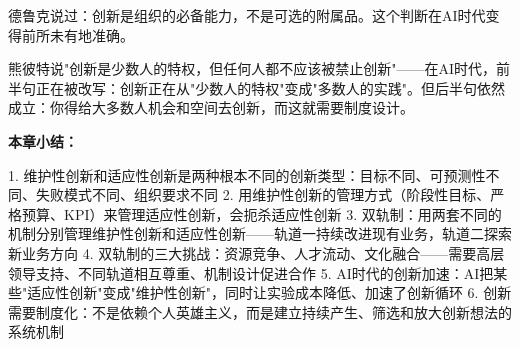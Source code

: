 德鲁克说过：创新是组织的必备能力，不是可选的附属品。这个判断在AI时代变得前所未有地准确。

熊彼特说"创新是少数人的特权，但任何人都不应该被禁止创新"——在AI时代，前半句正在被改写：创新正在从"少数人的特权"变成"多数人的实践"。但后半句依然成立：你得给大多数人机会和空间去创新，而这就需要制度设计。


\textbf{本章小结：}

1. 维护性创新和适应性创新是两种根本不同的创新类型：目标不同、可预测性不同、失败模式不同、组织要求不同
2. 用维护性创新的管理方式（阶段性目标、严格预算、KPI）来管理适应性创新，会扼杀适应性创新
3. 双轨制：用两套不同的机制分别管理维护性创新和适应性创新——轨道一持续改进现有业务，轨道二探索新业务方向
4. 双轨制的三大挑战：资源竞争、人才流动、文化融合——需要高层领导支持、不同轨道相互尊重、机制设计促进合作
5. AI时代的创新加速：AI把某些"适应性创新"变成"维护性创新"，同时让实验成本降低、加速了创新循环
6. 创新需要制度化：不是依赖个人英雄主义，而是建立持续产生、筛选和放大创新想法的系统机制

